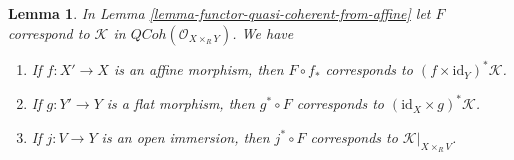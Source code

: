 \documentclass[10pt,a4paper]{amsart}
\theoremstyle{plain}
\newtheorem{lemma}[subsection]{Lemma}
\theoremstyle{definition}
\theoremstyle{remark}
\numberwithin{equation}{subsection}
\def\QCoh{\mathit{QCoh}}
\begin{document}
\begin{lemma}
\label{lemma-functor-quasi-coherent-from-affine-compose}
In Lemma \ref{lemma-functor-quasi-coherent-from-affine} let $F$
correspond to $\mathcal{K}$ in $\QCoh(\mathcal{O}_{X \times_R Y})$.
We have
\begin{enumerate}
\item If $f : X' \to X$ is an affine morphism, then $F \circ f_*$
corresponds to $(f \times \text{id}_Y)^*\mathcal{K}$.
\item If $g : Y' \to Y$ is a flat morphism, then $g^* \circ F$ corresponds to
$(\text{id}_X \times g)^*\mathcal{K}$.
\item If $j : V \to Y$ is an open immersion, then $j^* \circ F$
corresponds to $\mathcal{K}|_{X \times_R V}$.
\end{enumerate}
\end{lemma}
\end{document}
